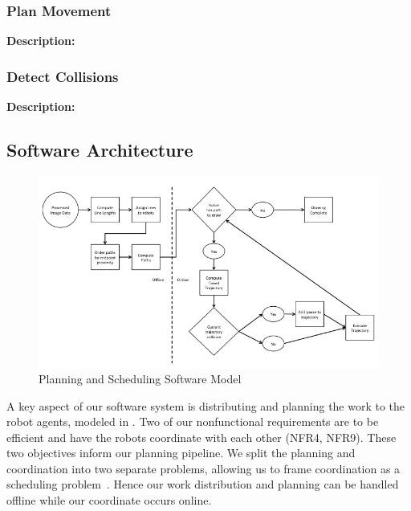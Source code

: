 \subsubsection{Plan Movement}
\textbf{Description:} 

\subsubsection{Detect Collisions}
\textbf{Description:}  

\subsection{Software Architecture}
\label{sec:sw_arch_planner}

\begin{figure}[h!]
 \centering
  \includegraphics[width=0.99\columnwidth]{diagrams/sw_arch_planning.jpg}
	\caption{Planning and Scheduling Software Model}
 \label{fig:planning_processing}
\end{figure}

A key aspect of our software system is distributing and planning the work to the robot agents, modeled in .
Two of our nonfunctional requirements are to be efficient and have the robots coordinate with each other (NFR4, NFR9). These two objectives inform our planning pipeline. We split the planning and coordination into two separate problems, allowing us to frame coordination as a scheduling problem~\cite{o1989deadlock}. Hence our work distribution and planning can be handled offline while our coordinate occurs online. 


